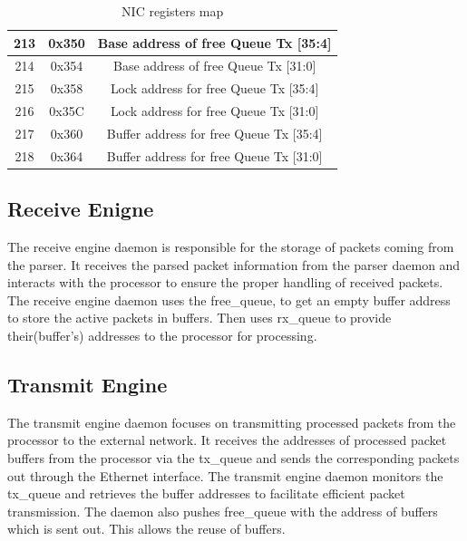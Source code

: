 \documentclass[12pt]{report}
\begin{document}
\begin{appendices}
\begin{table}[h!]
\begin{tabular}{|c|c|c|}
                          213  & 0x350   & Base address of free Queue Tx  [35:4]      \\ \hline
                         214  & 0x354    & Base address of free Queue Tx [31:0]  \\ \hline
                         215  & 0x358   & Lock address for free Queue Tx [35:4]  \\ \hline
					216  & 0x35C   & Lock address for free Queue Tx [31:0]  \\ \hline
					217  & 0x360   & Buffer address for free Queue Tx [35:4] \\ \hline
                        218  & 0x364   & Buffer address for free Queue Tx [31:0] \\ \hline


                        
                       
				\end{tabular}
				\caption{NIC registers map}
				\label{tab:NIC_REG}
			\end{table}



		\subsection{Receive Enigne}
				The receive engine daemon is responsible for the storage of packets coming from the parser. It receives the parsed packet information from the parser daemon and interacts with the processor to ensure the proper handling of received packets. The receive engine daemon uses the free\_queue, to get an empty buffer address to store the active packets in buffers.
			Then uses rx\_queue to provide their(buffer's) addresses to the processor for processing. 
		\subsection{Transmit Engine}
				The transmit engine daemon focuses on transmitting processed packets from the processor to the external network. It receives the addresses of processed packet buffers from the processor via the tx\_queue and sends the corresponding packets out through the Ethernet interface. The transmit engine daemon monitors the tx\_queue and retrieves the buffer addresses to facilitate efficient packet transmission. The daemon also pushes free\_queue with the address of buffers which is sent out. This allows the reuse of buffers. 
			

\end{appendices}
\end{document}
